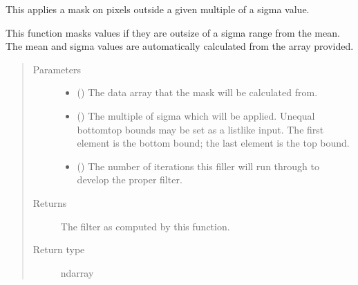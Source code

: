 \documentclass[letterpaper,10pt,english]{sphinxmanual}
\begin{document}

\begin{fulllineitems}
\label{\detokenize{docstrings/ifa_smeargle.masking.filters:ifa_smeargle.masking.filters.filter_sigma_value}}
This applies a mask on pixels outside a given multiple of a sigma
value.

This function masks values if they are outsize of a sigma range
from the mean. The mean and sigma values are automatically
calculated from the array provided.
\begin{quote}\begin{description}
\item[{Parameters}] \leavevmode\begin{itemize}
\item {} 
 () \textendash{} The data array that the mask will be calculated from.

\item {} 
 () \textendash{} The multiple of sigma which will be applied. Unequal
bottom\sphinxhyphen{}top bounds may be set as a list\sphinxhyphen{}like input. The
first element is the bottom bound; the last element is the
top bound.

\item {} 
 () \textendash{} The number of iterations this filler will run through to
develop the proper filter.

\end{itemize}

\item[{Returns}] \leavevmode
{} \textendash{} The filter as computed by this function.

\item[{Return type}] \leavevmode
ndarray

\end{description}\end{quote}

\end{fulllineitems}
\end{document}
